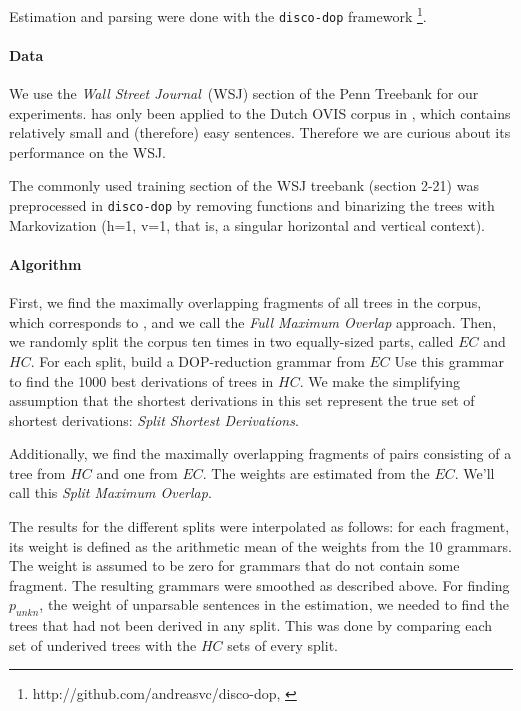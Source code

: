 Estimation and parsing were done with the {\tt disco-dop} framework
 \footnote{http://github.com/andreasvc/disco-dop, \cite{cranenburgh2011}}.


\paragraph{Data}
We use the \emph{Wall Street Journal}~(WSJ) section of the Penn Treebank for our experiments. \dops{} has only been applied to the Dutch OVIS corpus in \cite{zollmann2005}, which contains relatively small and (therefore) easy sentences. Therefore we are curious about its performance on the WSJ.

The commonly used training section of the WSJ treebank (section 2-21) was preprocessed in {\tt disco-dop} by removing functions and binarizing the trees with Markovization (h=1, v=1, that is, a singular horizontal and vertical context). %



\paragraph{Algorithm}
First, we find the maximally overlapping fragments of all trees in the corpus, which corresponds to \ddop, and we call the \emph{Full Maximum Overlap} approach.
Then, we randomly split the corpus ten times in two equally-sized parts, called $EC$ and $HC$. For each split, build a DOP-reduction grammar from $EC$ 
Use this grammar to find the 1000 best derivations of trees in $HC$. We make the simplifying assumption that the shortest derivations in this set  represent the true set of shortest derivations: \emph{Split Shortest Derivations}.

 Additionally, we find the maximally overlapping fragments of pairs consisting of a tree from $HC$ and one from $EC$. The weights are estimated from the $EC$. We'll call this \emph{Split Maximum Overlap}.

The results for the different splits were interpolated as follows: for each fragment, its weight is defined as the arithmetic mean of the weights from the 10 grammars. The weight is assumed to be zero for grammars that do not contain some fragment.
The resulting grammars were smoothed as described above. For finding $p_{unkn}$, the weight of unparsable sentences in the \dops{} estimation, we needed to find the trees that had not been derived in any split. This was done by comparing each set of underived trees with the $HC$ sets of every split.

